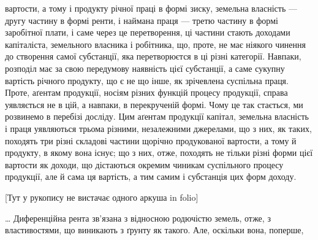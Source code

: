 вартости, а тому і продукту річної праці в формі зиску, земельна власність
— другу частину в формі ренти, і наймана праця — третю частину в формі
заробітної плати, і саме через це перетворення, ці частини стають доходами
капіталіста, земельного власника і робітника, що, проте, не має ніякого чинення
до створення самої субстанції, яка перетворюєтся в ці різні категорії. Навпаки,
розподіл має за свою передумову наявність цієї субстанції, а саме сукупну вартість
річного продукту, що є не що інше, як зрічевлена суспільна праця. Проте,
аґентам продукції, носіям різних функцій процесу продукції, справа уявляється
не в цій, а навпаки, в перекрученій формі. Чому це так стається, ми розвинемо
в перебізі досліду. Цим аґентам продукції капітал, земельна власність і
праця уявляються трьома різними, незалежними джерелами, що з них, як таких,
походять три різні складові частини щорічно продукованої вартости, а
тому й продукту, в якому вона існує; що з них, отже, походять не тільки різні
форми цієї вартости як доходи, що дістаються окремим чиникам суспільного процесу
продукції, але й сама ця вартість, а тим самим і субстанція цих форм
доходу.

[Тут у рукопису не вистачає одного аркуша in folio]

\dots{} Диференційна рента зв’язана з відносною родючістю земель, отже,
з властивостями, що виникають з ґрунту як такого. Але, оскільки вона, поперше,
\parbreak{}  %
